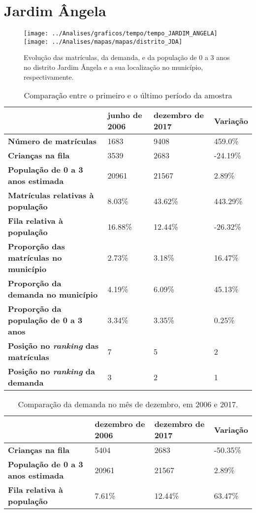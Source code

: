 \section{Jardim Ângela}
\begin{figure}[H]
	\centering
	\texttt{[image: ../Analises/graficos/tempo/tempo\_JARDIM\_ANGELA]}
	\texttt{[image: ../Analises/mapas/mapas/distrito\_JDA]}
	\caption{Evolução das matrículas, da demanda, e da população de 0 a 3 anos no distrito Jardim Ângela e a sua localização no município, respectivamente.}
\end{figure}
\begin{table}[H]
	\begin{tabular}{|l|l|l|l|}
		\hline
		\textbf{}                                      & \textbf{junho de 2006}       & \textbf{dezembro de 2017}    & \textbf{Variação} \\ \hline
		\textbf{Número de matrículas}                  & 1683 & 9408 & 459.0\% \\ \hline
		\textbf{Crianças na fila}                      & 3539 & 2683 & -24.19\% \\ \hline
		\textbf{População de 0 a 3 anos estimada}      & 20961 & 21567 & 2.89\% \\ \hline
		\textbf{Matrículas relativas à população}      & 8.03\% & 43.62\% & 443.29\% \\ \hline
		\textbf{Fila relativa à população}             & 16.88\% & 12.44\% & -26.32\% \\ \hline
		\textbf{Proporção das matrículas no município} & 2.73\% & 3.18\% & 16.47\% \\ \hline
		\textbf{Proporção da demanda no município}     & 4.19\% & 6.09\% & 45.13\% \\ \hline
		\textbf{Proporção da população de 0 a 3 anos}  & 3.34\% & 3.35\% & 0.25\% \\ \hline
		\textbf{Posição no \textit{ranking} das matrículas}     & 7 & 5 & 2 \\ \hline
		\textbf{Posição no \textit{ranking} da demanda}         & 3 & 2 & 1 \\ \hline
	\end{tabular}
	\caption{Comparação entre o primeiro e o último período da amostra}
\end{table}
\begin{table}[H]
	\begin{tabular}{|l|l|l|l|}
		\hline
		\textbf{}                                 & \textbf{dezembro de 2006} & \textbf{dezembro de 2017} & \textbf{Variação} \\ \hline
		\textbf{Crianças na fila}                      & 5404 & 2683 & -50.35\% \\ \hline
		\textbf{População de 0 a 3 anos estimada}      & 20961 & 21567 & 2.89\% \\ \hline
		\textbf{Fila relativa à população}             & 7.61\% & 12.44\% & 63.47\% \\ \hline
	\end{tabular}
	\caption{Comparação da demanda no mês de dezembro, em 2006 e 2017.}
\end{table}
